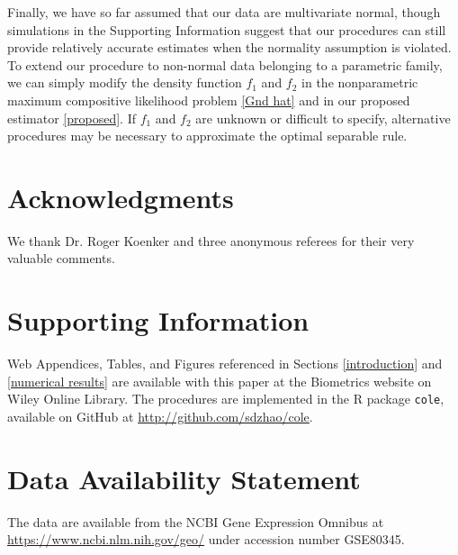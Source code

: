 \documentclass[useAMS,referee,usenatbib]{biom}
\begin{document}
Finally, we have so far assumed that our data are multivariate normal, though simulations in the Supporting Information suggest that our procedures can still provide relatively accurate estimates when the normality assumption is violated. To extend our procedure to non-normal data belonging to a parametric family, we can simply modify the density function $f_1$ and $f_2$ in the nonparametric maximum compositive likelihood problem \eqref{Gnd hat} and in our proposed estimator \eqref{proposed}. If $f_1$ and $f_2$ are unknown or difficult to specify, alternative procedures may be necessary to approximate the optimal separable rule.

\backmatter

\section*{Acknowledgments}
We thank Dr. Roger Koenker and three anonymous referees for their very valuable comments.\vspace*{-8pt}


\section*{Supporting Information}
Web Appendices, Tables, and Figures referenced in Sections \ref{introduction} and \ref{numerical results} are available with this paper at the Biometrics website on Wiley Online Library. The procedures are implemented in the R package \verb|cole|, available on GitHub at \url{http://github.com/sdzhao/cole}.

\section*{Data Availability Statement}
The data are available from the NCBI Gene Expression Omnibus at \url{https://www.ncbi.nlm.nih.gov/geo/} under accession number GSE80345.

 


\label{lastpage}
\end{document}
